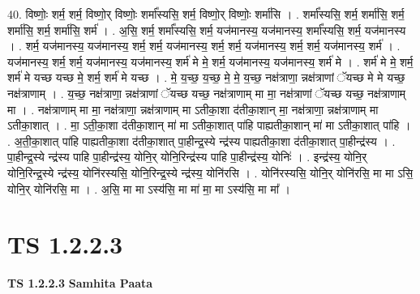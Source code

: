 \documentclass[17pt]{extarticle}
\begin{document}
40. विष्णोः॒ शर्म॒ शर्म॒ विष्णो॒र् विष्णोः॒ शर्मा᳚स्यसि॒ शर्म॒ विष्णो॒र् विष्णोः॒ शर्मा॑सि । . शर्मा᳚स्यसि॒ शर्म॒ शर्मा॑सि॒ शर्म॒ शर्मा॑सि॒ शर्म॒ शर्मा॑सि॒ शर्म॑ । . अ॒सि॒ शर्म॒ शर्मा᳚स्यसि॒ शर्म॒ यज॑मानस्य॒ यज॑मानस्य॒ शर्मा᳚स्यसि॒ शर्म॒ यज॑मानस्य । . शर्म॒ यज॑मानस्य॒ यज॑मानस्य॒ शर्म॒ शर्म॒ यज॑मानस्य॒ शर्म॒ शर्म॒ यज॑मानस्य॒ शर्म॒ शर्म॒ यज॑मानस्य॒ शर्म॑ । . यज॑मानस्य॒ शर्म॒ शर्म॒ यज॑मानस्य॒ यज॑मानस्य॒ शर्म॑ मे मे॒ शर्म॒ यज॑मानस्य॒ यज॑मानस्य॒ शर्म॑ मे । . शर्म॑ मे मे॒ शर्म॒ शर्म॑ मे यच्छ यच्छ मे॒ शर्म॒ शर्म॑ मे यच्छ । . मे॒ य॒च्छ॒ य॒च्छ॒ मे॒ मे॒ य॒च्छ॒ नक्ष॑त्राणा॒ न्नक्ष॑त्राणां ॅयच्छ मे मे यच्छ॒ नक्ष॑त्राणाम् । . य॒च्छ॒ नक्ष॑त्राणा॒ न्नक्ष॑त्राणां ॅयच्छ यच्छ॒ नक्ष॑त्राणाम् मा मा॒ नक्ष॑त्राणां ॅयच्छ यच्छ॒ नक्ष॑त्राणाम् मा । . नक्ष॑त्राणाम् मा मा॒ नक्ष॑त्राणा॒ न्नक्ष॑त्राणाम् मा ऽतीका॒शा द॑तीका॒शान् मा॒ नक्ष॑त्राणा॒ न्नक्ष॑त्राणाम् मा ऽतीका॒शात् । . मा॒ ऽती॒का॒शा द॑तीका॒शान् मा॑ मा ऽतीका॒शात् पा॑हि पाह्यतीका॒शान् मा॑ मा ऽतीका॒शात् पा॑हि । . अ॒ती॒का॒शात् पा॑हि पाह्यतीका॒शा द॑तीका॒शात् पा॒हीन्द्र॒स्ये न्द्र॑स्य पाह्यतीका॒शा द॑तीका॒शात् पा॒हीन्द्र॑स्य । . पा॒हीन्द्र॒स्ये न्द्र॑स्य पाहि पा॒हीन्द्र॑स्य॒ योनि॒र् योनि॒रिन्द्र॑स्य पाहि पा॒हीन्द्र॑स्य॒ योनिः॑ । . इन्द्र॑स्य॒ योनि॒र् योनि॒रिन्द्र॒स्ये न्द्र॑स्य॒ योनि॑रस्यसि॒ योनि॒रिन्द्र॒स्ये न्द्र॑स्य॒ योनि॑रसि । . योनि॑रस्यसि॒ योनि॒र् योनि॑रसि॒ मा मा ऽसि॒ योनि॒र् योनि॑रसि॒ मा । . अ॒सि॒ मा मा ऽस्य॑सि॒ मा मा॑ मा॒ मा ऽस्य॑सि॒ मा मा᳚ । \newline
\pagebreak
{}

\section{ TS 1.2.2.3 }

\textbf{TS 1.2.2.3 } \newline
\textbf{Samhita Paata} \newline
\end{document}
